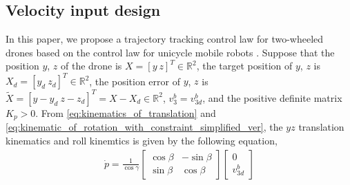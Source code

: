 \subsection{Velocity input design}
\label{subsec:velocity_input_design}

In this paper, we propose a trajectory tracking control law for two-wheeled drones based on the control law for unicycle mobile robots \cite{rodriguez-cortesNewGeometricTrajectory2022}.
Suppose that the position $ y $, $ z $ of the drone is $ X = [y ~ z]^T \in \mathbb{R}^2 $, the target position of $ y $, $ z $ is $ X_d = [y_d ~ z_d]^T \in \mathbb{R}^2 $, the position error of $ y $, $ z $ is $ \tilde{X} = [y - y_d ~ z - z_d ]^T = X - X_d \in \mathbb{R}^2 $, $ v_3^b = v_{3d}^b $, and the positive definite matrix $ K_p > 0 $.
From \eqref{eq:kinematics_of_translation} and \eqref{eq:kinematic_of_rotation_with_constraint_simplified_ver}, the $ yz $ translation kinematics and roll kinemtics is given by the following equation, 
\begin{align}
    \label{eq:translation_kinematics_of_yz_without_second_term}
    \dot{p} = \frac{1}{\cos \gamma}
    \begin{bmatrix}
        \cos \beta & - \sin \beta \\
        \sin \beta & \cos \beta
    \end{bmatrix}
    \begin{bmatrix}
        0 \\
        v_{3d}^b
    \end{bmatrix}
\end{align}

